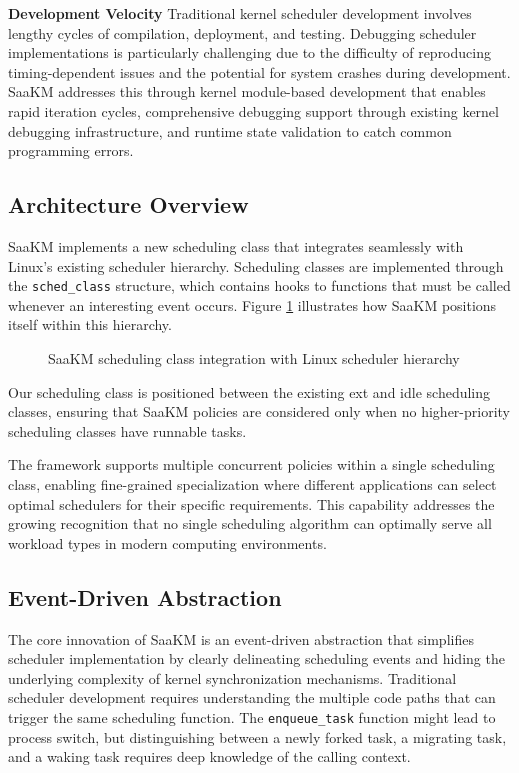 \parspace
\textbf{Development Velocity} Traditional kernel scheduler development involves lengthy cycles of compilation, deployment, and testing. Debugging scheduler implementations is particularly challenging due to the difficulty of reproducing timing-dependent issues and the potential for system crashes during development. SaaKM addresses this through kernel module-based development that enables rapid iteration cycles, comprehensive debugging support through existing kernel debugging infrastructure, and runtime state validation to catch common programming errors.

\subsection{Architecture Overview}

SaaKM implements a new scheduling class that integrates seamlessly with Linux's existing scheduler hierarchy. Scheduling classes are implemented through the \texttt{sched\_class} structure, which contains hooks to functions that must be called whenever an interesting event occurs. Figure \ref{fig:sched-class-saakm} illustrates how SaaKM positions itself within this hierarchy.

\begin{figure}[htbp]
    \centering
    
    \caption{SaaKM scheduling class integration with Linux scheduler hierarchy}
    \label{fig:sched-class-saakm}
\end{figure}

Our scheduling class is positioned between the existing ext and idle scheduling classes, ensuring that SaaKM policies are considered only when no higher-priority scheduling classes have runnable tasks.

\parspace
The framework supports multiple concurrent policies within a single scheduling class, enabling fine-grained specialization where different applications can select optimal schedulers for their specific requirements. This capability addresses the growing recognition that no single scheduling algorithm can optimally serve all workload types in modern computing environments.

\subsection{Event-Driven Abstraction}

The core innovation of SaaKM is an event-driven abstraction that simplifies scheduler implementation by clearly delineating scheduling events and hiding the underlying complexity of kernel synchronization mechanisms. Traditional scheduler development requires understanding the multiple code paths that can trigger the same scheduling function. The \texttt{enqueue\_task} function might lead to process switch, but distinguishing between a newly forked task, a migrating task, and a waking task requires deep knowledge of the calling context.

